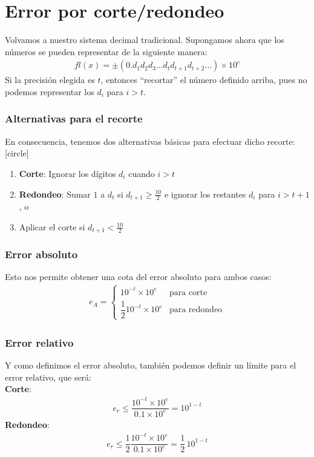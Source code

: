 \section{Error por corte/redondeo}
\begin{frame}
Volvamos a nuestro sistema decimal tradicional. Supongamos ahora que los números se pueden representar de la siguiente manera:
\begin{align*}
fl(x) = \pm (0 . d_{1} d_{2} d_{3} \ldots d_{t} d_{t+1} d_{t+2} \ldots) \times 10^{e}
\end{align*}
Si la precisión elegida es $t$, entonces \enquote{recortar} el número definido arriba, pues no podemos representar los $d_{i}$ para $i > t$.
\end{frame}
\begin{frame}[fragile]
\frametitle{Alternativas para el recorte}
En consecuencia, tenemos dos alternativas básicas para efectuar dicho recorte:
[circle]
\begin{enumerate}[<+->]
\item  \textbf{Corte}: Ignorar los dígitos $d_{i}$ cuando $i > t$
\item \textbf{Redondeo}: Sumar $1$ a $d_{t}$ si $d_{t+1}\geq \frac{10}{2}$ e ignorar los restantes $d_{i}$ para $i > t + 1$, o
\item Aplicar el corte si $d_{t+1} < \frac{10}{2}$
\end{enumerate}
\end{frame}
\begin{frame}
\frametitle{Error absoluto}
Esto nos permite obtener una cota del error absoluto para ambos casos:
\begin{align*}
e_{A} = \left\{ \begin{array}{ll}
10^{-t} \times 10^{e} & \mbox{para corte} \\[0.5em]
\dfrac{1}{2} 10^{-t} \times 10^{e} & \text{para redondeo}
\end{array} \right.
\end{align*}
\end{frame}
\begin{frame}
\frametitle{Error relativo}
Y como definimos el error absoluto, también podemos definir un límite para el error relativo, que será:
\\
\medskip
\textbf{Corte}:
\begin{align*}
e_{r} \leq \dfrac{10^{-t} \times 10^{e}}{0.1 \times 10^{e}} = 10^{1-t}
\end{align*}
\textbf{Redondeo}:
\begin{align*}
e_{r} \leq \dfrac{1}{2}\dfrac{10^{-t} \times 10^{e}}{0.1 \times 10^{e}} = \dfrac{1}{2} \, 10^{1-t}
\end{align*}
\end{frame}
